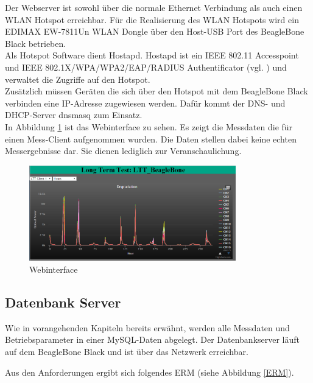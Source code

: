 Der Webserver ist sowohl über die normale Ethernet Verbindung als auch einen WLAN Hotspot erreichbar. Für die Realisierung des WLAN Hotspots wird ein EDIMAX EW-7811Un WLAN Dongle über den Host-USB Port des BeagleBone Black betrieben.\\
Als Hotspot Software dient Hostapd. Hostapd ist ein IEEE 802.11 Accesspoint und IEEE 802.1X/WPA/WPA2/EAP/RADIUS Authentificator (vgl. \cite{LinuxWireless}) und verwaltet die Zugriffe auf den Hotspot.\\
Zusätzlich müssen Geräten die sich über den Hotspot mit dem BeagleBone Black verbinden eine IP-Adresse zugewiesen werden. Dafür kommt der DNS- und DHCP-Server dnsmasq zum Einsatz.\\

In Abbildung \ref{figure_Webinterface} ist das Webinterface zu sehen. Es zeigt die Messdaten die für einen Mess-Client aufgenommen wurden. Die Daten stellen dabei keine echten Messergebnisse dar. Sie dienen lediglich zur Veranschaulichung.

\begin{figure}[H]
\begin{center}
\includegraphics[width=0.8\textwidth ]{img/general/Webinterface.png}
\caption{Webinterface}
\label{figure_Webinterface}
\end{center}
\end{figure}
\newpage
 
\subsection{Datenbank Server}
\label{section_EntwurfDatenbank}

Wie in vorangehenden Kapiteln bereits erwähnt, werden alle Messdaten und Betriebsparameter in einer MySQL-Daten abgelegt. Der Datenbankserver läuft auf dem BeagleBone Black und ist über das Netzwerk erreichbar.

Aus den Anforderungen ergibt sich folgendes \ac{ERM} (siehe Abbildung \ref{ERM}). \\

